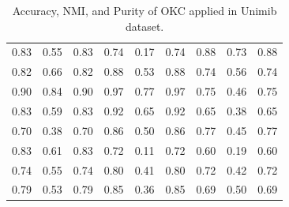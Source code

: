 \documentclass[10pt,final]{IEEEtran}
\begin{document}
\begin{center}
\begin{table}[h!]
\begin{tabular}{|c|c|c|c|c|c|c|c|c|}
    0.83 & 0.55 & 0.83 & 0.74 & 0.17 & 0.74 & 0.88 & 0.73 & 0.88\\
    0.82 & 0.66 & 0.82 & 0.88 & 0.53 & 0.88 & 0.74 & 0.56 & 0.74\\
    0.90 & 0.84 & 0.90 & 0.97 & 0.77 & 0.97 & 0.75 & 0.46 & 0.75\\
    0.83 & 0.59 & 0.83 & 0.92 & 0.65 & 0.92 & 0.65 & 0.38 & 0.65\\
    0.70 & 0.38 & 0.70 & 0.86 & 0.50 & 0.86 & 0.77 & 0.45 & 0.77\\
    0.83 & 0.61 & 0.83 & 0.72 & 0.11 & 0.72 & 0.60 & 0.19 & 0.60\\
    0.74 & 0.55 & 0.74 & 0.80 & 0.41 & 0.80 & 0.72 & 0.42 & 0.72\\
    0.79 & 0.53 & 0.79 & 0.85 & 0.36 & 0.85 & 0.69 & 0.50 & 0.69\\
    \hline
\end{tabular}
\caption{\label{tab:Table I}Accuracy, NMI, and Purity of OKC  applied in Unimib dataset.}
\end{table}
\end{center}
\end{document}
